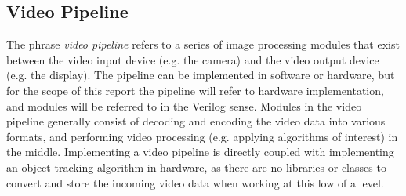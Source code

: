 \documentclass[11pt]{article} %
\begin{document}
\subsection{Video Pipeline}
The phrase \textit{video pipeline} refers to a series of image processing modules that exist between the video input device (e.g. the camera) and the video output device (e.g. the display). The pipeline can be implemented in software or hardware, but for the scope of this report the pipeline will refer to hardware implementation, and modules will be referred to in the Verilog sense. Modules in the video pipeline generally consist of decoding and encoding the video data into various formats, and performing video processing (e.g. applying algorithms of interest) in the middle. Implementing a video pipeline is directly coupled with implementing an object tracking algorithm in hardware, as there are no libraries or classes to convert and store the incoming video data when working at this low of a level.
\end{document}
